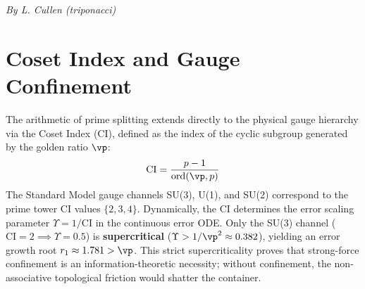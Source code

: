 \begin{center}\textit{By L. Cullen (triponacci)}\end{center}


\section*{Coset Index and Gauge Confinement}

The arithmetic of prime splitting extends directly to the physical gauge hierarchy via the Coset Index (CI), defined as the index of the cyclic subgroup generated by the golden ratio $\vp$:
\begin{equation}
\mathrm{CI} = \frac{p-1}{\mathrm{ord}(\vp, p)}
\end{equation}
The Standard Model gauge channels SU(3), U(1), and SU(2) correspond to the prime tower CI values $\{2, 3, 4\}$. Dynamically, the CI determines the error scaling parameter $\Upsilon = 1/\mathrm{CI}$ in the continuous error ODE. Only the SU(3) channel ($\mathrm{CI} = 2 \implies \Upsilon = 0.5$) is \textbf{supercritical} ($\Upsilon > 1/\vp^2 \approx 0.382$), yielding an error growth root $r_1 \approx 1.781 > \vp$. This strict supercriticality proves that strong-force confinement is an information-theoretic necessity; without confinement, the non-associative topological friction would shatter the container.


